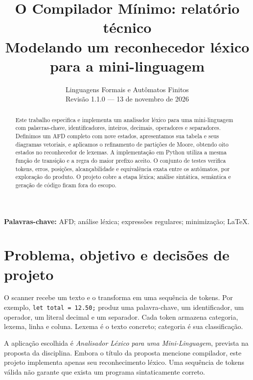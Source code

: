 \documentclass[12pt,a4paper]{article}
\title{\color{azul}\textbf{O Compilador Mínimo: relatório técnico}\\[4mm]
\large Modelando um reconhecedor léxico para a mini-linguagem \MiniL}
\author{\normalsize\grupo}
\date{Linguagens Formais e Autômatos Finitos\\Revisão 1.1.0 --- 13 de novembro de 2026}
\begin{document}
\maketitle
\begin{abstract}
Este trabalho especifica e implementa um analisador léxico para uma mini-linguagem
com palavras-chave, identificadores, inteiros, decimais, operadores e separadores.
Definimos um AFD completo com nove estados, apresentamos sua tabela e seus
diagramas vetoriais, e aplicamos o refinamento de partições de Moore, obtendo
oito estados no reconhecedor de lexemas. A implementação em Python utiliza a
mesma função de transição e a regra do maior prefixo aceito. O conjunto de
testes verifica tokens, erros, posições, alcançabilidade e equivalência exata
entre os autômatos, por exploração do produto. O projeto cobre a etapa léxica;
análise sintática, semântica e geração de código ficam fora do escopo.
\end{abstract}
\textbf{Palavras-chave:} AFD; análise léxica; expressões regulares; minimização; LaTeX.
\tableofcontents
\newpage
\section{Problema, objetivo e decisões de projeto}
O scanner recebe um texto e o transforma em uma sequência de tokens. Por exemplo,
\texttt{let total = 12.50;} produz uma palavra-chave, um identificador, um operador,
um literal decimal e um separador. Cada token armazena categoria, lexema, linha e
coluna. Lexema é o texto concreto; categoria é sua classificação.

A aplicação escolhida é \emph{Analisador Léxico para uma Mini-Linguagem}, prevista
na proposta da disciplina. Embora o título da proposta mencione compilador,
este projeto implementa apenas seu reconhecimento léxico. Uma sequência de
tokens válida não garante que exista um programa sintaticamente correto.
\end{document}
